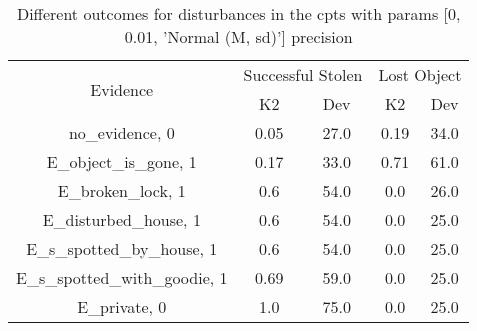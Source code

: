 \begin{table}\begin{tabular}{c|cc|cc}\toprule\multirow{2}{*}{Evidence} & \multicolumn{2}{c}{Successful Stolen} & \multicolumn{2}{c}{Lost Object} \\& {K2} & {Dev} & {K2} & {Dev} \\\midrule
no\_evidence, 0 & \cellcolor{Bittersweet}0.05&\cellcolor{Bittersweet}27.0&\cellcolor{Bittersweet}0.19&\cellcolor{Bittersweet}34.0\\E\_object\_is\_gone, 1 & \cellcolor{Bittersweet}0.17&\cellcolor{Bittersweet}33.0&\cellcolor{Bittersweet}0.71&\cellcolor{Bittersweet}61.0\\E\_broken\_lock, 1 & \cellcolor{Bittersweet}0.6&\cellcolor{Bittersweet}54.0&\cellcolor{Bittersweet}0.0&\cellcolor{Bittersweet}26.0\\E\_disturbed\_house, 1 & \cellcolor{Bittersweet}0.6&\cellcolor{Bittersweet}54.0&\cellcolor{Bittersweet}0.0&\cellcolor{Bittersweet}25.0\\E\_s\_spotted\_by\_house, 1 & \cellcolor{Bittersweet}0.6&\cellcolor{Bittersweet}54.0&\cellcolor{Bittersweet}0.0&\cellcolor{Bittersweet}25.0\\E\_s\_spotted\_with\_goodie, 1 & \cellcolor{Bittersweet}0.69&\cellcolor{Bittersweet}59.0&\cellcolor{Bittersweet}0.0&\cellcolor{Bittersweet}25.0\\E\_private, 0 & \cellcolor{Bittersweet}1.0&\cellcolor{Bittersweet}75.0&\cellcolor{Bittersweet}0.0&\cellcolor{Bittersweet}25.0\\\bottomrule\end{tabular}\caption{Different outcomes for disturbances in the cpts with params [0, 0.01, 'Normal (M, sd)'] precision}\end{table}